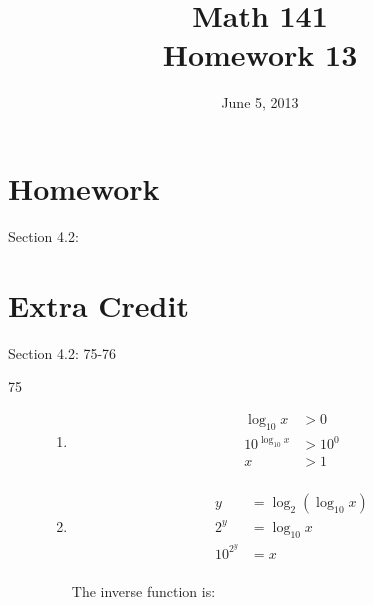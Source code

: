 \documentclass{exam}
\date{June 5, 2013}
\author{}
\title{Math 141 \\ Homework 13}
\begin{document}
  \maketitle

  \section{Homework}

  Section 4.2: 

  \section{Extra Credit}
  Section 4.2: 75-76

  \ifprintanswers
    \begin{description}
      \item[75]
        \begin{enumerate}[a]

          \item 
            \begin{align*}
              \log_{10} x      & > 0 \\
              10^{\log_{10} x} & > 10^0 \\
              x                & > 1 \\
            \end{align*}


          \item 
            \begin{align*}
              y        &= \log_2 (\log_{10} x) \\
              2^y      &= \log_{10} x \\
              10^{2^y} &= x \\
            \end{align*}

            The inverse function is: 



\end{enumerate}
\end{description}
\end{document}
